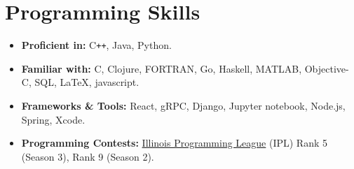 \documentclass[11pt,a4paper,sans]{moderncv}        %
\begin{document}
\vspace{-15pt}
\section{Programming Skills}
\vspace{-5pt}
\begin{itemize}
	\item \textbf{Proficient in:}
	      C\texttt{++}, 
	      Java,
	      Python.
	\item \textbf{Familiar with:}
		  C,
	      Clojure,
	      FORTRAN,
	      Go,
	      Haskell,
	      MATLAB,
		  Objective-C,
	      SQL,
	      \LaTeX,
	      javascript.
	\item \textbf{Frameworks \& Tools:}
	      React,
	      gRPC,
	      Django,
	      Jupyter notebook,
	      Node.js, 
		  Spring,
		  Xcode.
	\item \textbf{Programming Contests:}
	      \href{https://icpc.cs.illinois.edu/halloffame.html}{Illinois Programming League} (IPL) Rank 5 (Season 3), Rank 9 (Season 2).
\end{itemize}

% 
% 
\end{document}
